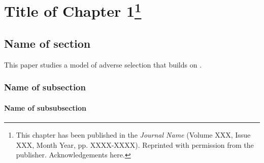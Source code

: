 \renewcommand*{\thefootnote}{\fnsymbol{footnote}}
\chapter[Title of Chapter 1]{Title of Chapter 1\footnote{\noindent
This chapter has been published in the \emph{Journal Name} (Volume XXX, Issue XXX, Month Year, pp. XXXX-XXXX). Reprinted with permission from the publisher. Acknowledgements here.}}
\label{chapter:chapter1-alias}
\newpage

\setcounter{footnote}{0}
\renewcommand*{\thefootnote}{\arabic{footnote}}

\section{\label{}Name of section}

This paper studies a model of adverse selection that builds on \citet{akerlof1970market}. \lipsum[1-2]



\lipsum[3-4]

\subsection{\label{}Name of subsection}

\lipsum[5-6]



\lipsum[7-8]

\subsubsection{\label{}Name of subsubsection}

\lipsum[9-10]

\newpage{}
\printbibliography[segment=0,heading=subbibintoc]

\newpage{}
\begin{subappendices}
\newrefsegment %

\end{subappendices}

